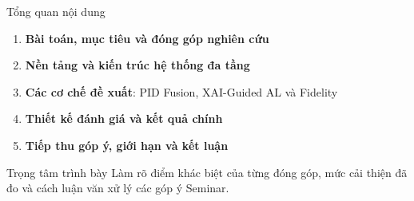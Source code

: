 \documentclass[aspectratio=169,10pt]{beamer}
\newcommand{\key}[1]{\textcolor{UETBlue}{\textbf{#1}}}
\begin{document}
\begin{frame}{Tổng quan nội dung}
\begin{enumerate}
  \setlength{\itemsep}{.28cm}
  \item \key{Bài toán, mục tiêu và đóng góp nghiên cứu}
  \item \key{Nền tảng và kiến trúc hệ thống đa tầng}
  \item \key{Các cơ chế đề xuất}: PID Fusion, XAI-Guided AL và Fidelity
  \item \key{Thiết kế đánh giá và kết quả chính}
  \item \key{Tiếp thu góp ý, giới hạn và kết luận}
\end{enumerate}
\vspace{.18cm}
\begin{block}{Trọng tâm trình bày}
Làm rõ điểm khác biệt của từng đóng góp, mức cải thiện đã đo và cách luận văn xử lý các góp ý Seminar.
\end{block}
\end{frame}
\end{document}
